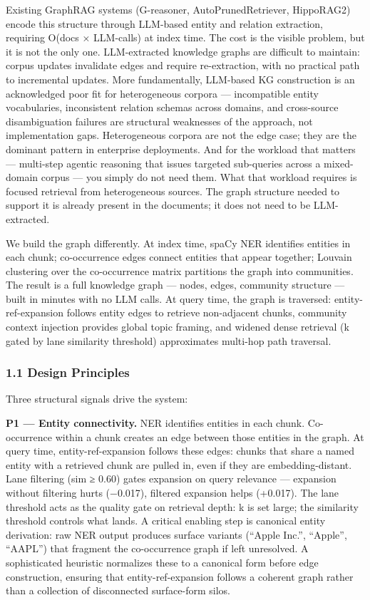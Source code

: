 \documentclass[
]{article}
\begin{document}
Existing GraphRAG systems (G-reasoner, AutoPrunedRetriever, HippoRAG2)
encode this structure through LLM-based entity and relation extraction,
requiring O(docs × LLM-calls) at index time. The cost is the visible
problem, but it is not the only one. LLM-extracted knowledge graphs are
difficult to maintain: corpus updates invalidate edges and require
re-extraction, with no practical path to incremental updates. More
fundamentally, LLM-based KG construction is an acknowledged poor fit for
heterogeneous corpora --- incompatible entity vocabularies, inconsistent
relation schemas across domains, and cross-source disambiguation
failures are structural weaknesses of the approach, not implementation
gaps. Heterogeneous corpora are not the edge case; they are the dominant
pattern in enterprise deployments. And for the workload that matters ---
multi-step agentic reasoning that issues targeted sub-queries across a
mixed-domain corpus --- you simply do not need them. What that workload
requires is focused retrieval from heterogeneous sources. The graph
structure needed to support it is already present in the documents; it
does not need to be LLM-extracted.

We build the graph differently. At index time, spaCy NER identifies
entities in each chunk; co-occurrence edges connect entities that appear
together; Louvain clustering over the co-occurrence matrix partitions
the graph into communities. The result is a full knowledge graph ---
nodes, edges, community structure --- built in minutes with no LLM
calls. At query time, the graph is traversed: entity-ref-expansion
follows entity edges to retrieve non-adjacent chunks, community context
injection provides global topic framing, and widened dense retrieval (k
gated by lane similarity threshold) approximates multi-hop path
traversal.

\subsubsection{1.1 Design Principles}\label{design-principles}

Three structural signals drive the system:

\textbf{P1 --- Entity connectivity.} NER identifies entities in each
chunk. Co-occurrence within a chunk creates an edge between those
entities in the graph. At query time, entity-ref-expansion follows these
edges: chunks that share a named entity with a retrieved chunk are
pulled in, even if they are embedding-distant. Lane filtering (sim ≥
0.60) gates expansion on query relevance --- expansion without filtering
hurts (−0.017), filtered expansion helps (+0.017). The lane threshold
acts as the quality gate on retrieval depth: k is set large; the
similarity threshold controls what lands. A critical enabling step is
canonical entity derivation: raw NER output produces surface variants
(``Apple Inc.'', ``Apple'', ``AAPL'') that fragment the co-occurrence
graph if left unresolved. A sophisticated heuristic normalizes these to
a canonical form before edge construction, ensuring that
entity-ref-expansion follows a coherent graph rather than a collection
of disconnected surface-form silos.
\end{document}
